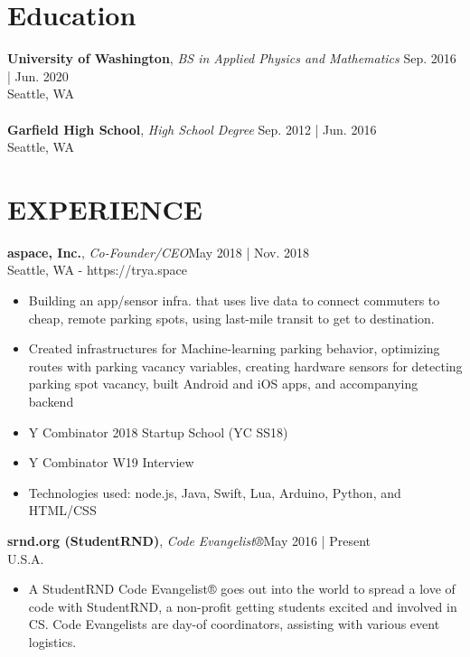 \documentclass[line,margin]{res}
\begin{document}
\address{me@f3d0r.com | (206) 372-8476 | Seattle, WA | f3d0r.com}
\begin{resume}
	\vspace{-5mm}
	        
	
	\section{Education}
	\textbf{University of Washington}, {\sl BS in Applied Physics and Mathematics} \hfill Sep. 2016 | Jun. 2020\\Seattle, WA\\\\
	\textbf{Garfield High School}, {\sl High School Degree} \hfill Sep. 2012 | Jun. 2016\\Seattle, WA
	\section{EXPERIENCE}
	\textbf{aspace, Inc.}, {\sl Co-Founder/CEO}\hfill May 2018 | Nov. 2018\\Seattle, WA - https://trya.space\\\begin{itemize} \itemsep 3pt
	\item Building an app/sensor infra. that uses live data to connect commuters to cheap, remote parking spots, using last-mile transit to get to destination.
	\item Created infrastructures for Machine-learning parking behavior, optimizing routes with parking vacancy variables, creating hardware sensors for detecting parking spot vacancy, built Android and iOS apps, and accompanying backend
	\item Y Combinator 2018 Startup School (YC SS18)
	\item Y Combinator W19 Interview
	\item Technologies used: node.js, Java, Swift, Lua, Arduino, Python, and HTML/CSS
	\end{itemize}
	\textbf{srnd.org (StudentRND)}, {\sl Code Evangelist®}\hfill May 2016 | Present\\U.S.A.\\\begin{itemize} \itemsep 3pt
	\item A StudentRND Code Evangelist® goes out into the world to spread a love of code with StudentRND, a non-profit getting students excited and involved in CS. Code Evangelists are day-of coordinators, assisting with various event logistics.
	\end{itemize}

\end{resume}
\end{document}

